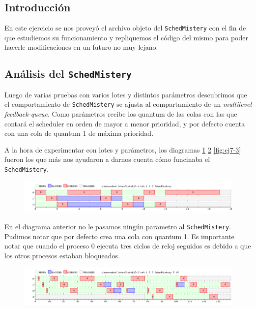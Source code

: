 \subsection{Introducción}
En este ejercicio se nos proveyó el archivo objeto del \texttt{SchedMistery} con el fin de que estudiemos su funcionamiento y repliquemos el código del mismo para poder hacerle modificaciones en un futuro no muy lejano.

\subsection{Análisis del \texttt{SchedMistery}}
Luego de varias pruebas con varios lotes y distintos parámetros descubrimos que el comportamiento de \texttt{SchedMistery} se ajusta al compartamiento de un \emph{multilevel feedback-queue}. Como parámetros recibe los quantum de las colas con las que contará el scheduler en orden de mayor a menor prioridad, y por defecto cuenta con una cola de quantum 1 de máxima prioridad.

A la hora de experimentar con lotes y parámetros, los diagramas \ref{fig:ej7-1} \ref{fig:ej7-2} \ref{fig:ej7-3} fueron los que más nos ayudaron a darnos cuenta cómo funcinaba el \texttt{SchedMistery}.

\begin{figure}[H]
  \centering
  \includegraphics[width=1\textwidth]{img/imgEj7-1}
  \caption{}
  \label{fig:ej7-1}
\end{figure}

En el diagrama anterior no le pasamos ningún parametro al \texttt{SchedMistery}. Pudimos notar que por defecto crea una cola con quantum 1. Es importante notar que cuando el proceso 0 ejecuta tres ciclos de reloj seguidos es debido a que los otros procesos estaban bloqueados.

\begin{figure}[H]
  \centering
  \includegraphics[width=1\textwidth]{img/imgEj7-2}
  \caption{}
  \label{fig:ej7-2}
\end{figure}

